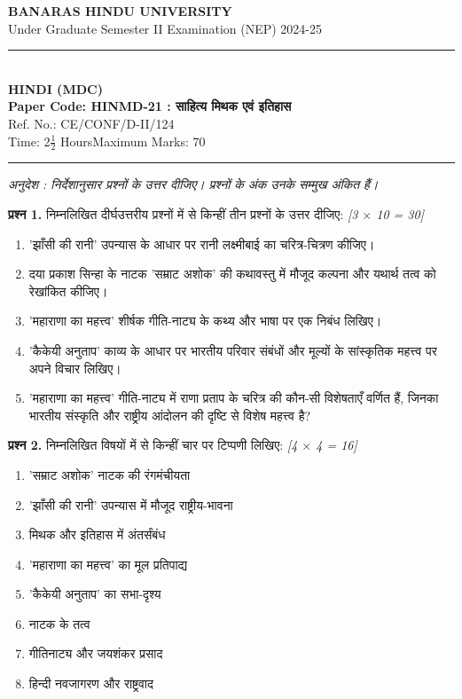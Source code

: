 \documentclass[11pt,a4paper]{article}
\newcommand{\pts}[1]{\hfill \textit{[#1]}}
\begin{document}
\begin{center}
  {\large\bfseries BANARAS HINDU UNIVERSITY}\\[2pt]
  {\normalsize Under Graduate Semester II Examination (NEP) 2024-25}\\[6pt]
  \rule{0.8\linewidth}{0.5pt}\\[6pt]
  {\large\bfseries HINDI (MDC)}\\[4pt]
  {\large\bfseries Paper Code: HINMD-21 : साहित्य मिथक एवं इतिहास}\\[2pt]
  {\small Ref. No.: CE/CONF/D-II/124}\\[4pt]
  {\normalsize Time: 2$\frac{1}{2}$ Hours\hfill Maximum Marks: 70}
\end{center}

\rule{\linewidth}{0.4pt}

\smallskip

\noindent \textit{अनुदेश : निर्देशानुसार प्रश्नों के उत्तर दीजिए। प्रश्नों के अंक उनके सम्मुख अंकित हैं।}

\bigskip

\noindent \textbf{प्रश्न 1.} निम्नलिखित दीर्घउत्तरीय प्रश्नों में से किन्हीं तीन प्रश्नों के उत्तर दीजिए: \pts{3 $\times$ 10 = 30}
\begin{enumerate}[label=(\alph*)]
  \item 'झाँसी की रानी' उपन्यास के आधार पर रानी लक्ष्मीबाई का चरित्र-चित्रण कीजिए।
  \item दया प्रकाश सिन्हा के नाटक 'सम्राट अशोक' की कथावस्तु में मौजूद कल्पना और यथार्थ तत्व को रेखांकित कीजिए।
  \item 'महाराणा का महत्त्व' शीर्षक गीति-नाट्य के कथ्य और भाषा पर एक निबंध लिखिए।
  \item 'कैकेयी अनुताप' काव्य के आधार पर भारतीय परिवार संबंधों और मूल्यों के सांस्कृतिक महत्त्व पर अपने विचार लिखिए।
  \item 'महाराणा का महत्त्व' गीति-नाट्य में राणा प्रताप के चरित्र की कौन-सी विशेषताएँ वर्णित हैं, जिनका भारतीय संस्कृति और राष्ट्रीय आंदोलन की दृष्टि से विशेष महत्त्व है?
\end{enumerate}

\bigskip

\noindent \textbf{प्रश्न 2.} निम्नलिखित विषयों में से किन्हीं चार पर टिप्पणी लिखिए: \pts{4 $\times$ 4 = 16}
\begin{enumerate}[label=(\alph*)]
  \item 'सम्राट अशोक' नाटक की रंगमंचीयता
  \item 'झाँसी की रानी' उपन्यास में मौजूद राष्ट्रीय-भावना
  \item मिथक और इतिहास में अंतर्संबंध
  \item 'महाराणा का महत्त्व' का मूल प्रतिपाद्य
  \item 'कैकेयी अनुताप' का सभा-दृश्य
  \item नाटक के तत्व
  \item गीतिनाट्य और जयशंकर प्रसाद
  \item हिन्दी नवजागरण और राष्ट्रवाद
\end{enumerate}
\end{document}
